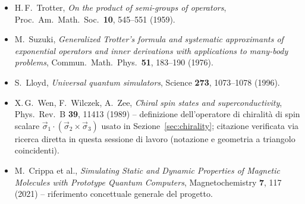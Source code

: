 \documentclass[11pt,a4paper]{article}
\begin{document}
\begin{itemize}
\item H.\,F.\ Trotter, \emph{On the product of semi-groups of operators}, Proc.\ Am.\ Math.\ Soc.\ \textbf{10}, 545--551 (1959).
\item M.\ Suzuki, \emph{Generalized Trotter's formula and systematic approximants of exponential operators and inner derivations with applications to many-body problems}, Commun.\ Math.\ Phys.\ \textbf{51}, 183--190 (1976).
\item S.\ Lloyd, \emph{Universal quantum simulators}, Science \textbf{273}, 1073--1078 (1996).
\item X.\,G.\ Wen, F.\ Wilczek, A.\ Zee, \emph{Chiral spin states and superconductivity}, Phys.\ Rev.\ B \textbf{39}, 11413 (1989) -- definizione dell'operatore di chiralità di spin scalare $\vec\sigma_1\cdot(\vec\sigma_2\times\vec\sigma_3)$ usato in Sezione~\ref{sec:chirality}; citazione verificata via ricerca diretta in questa sessione di lavoro (notazione e geometria a triangolo coincidenti).
\item M.\ Crippa et al., \emph{Simulating Static and Dynamic Properties of Magnetic Molecules with Prototype Quantum Computers}, Magnetochemistry \textbf{7}, 117 (2021) -- riferimento concettuale generale del progetto.
\end{itemize}
\end{document}
